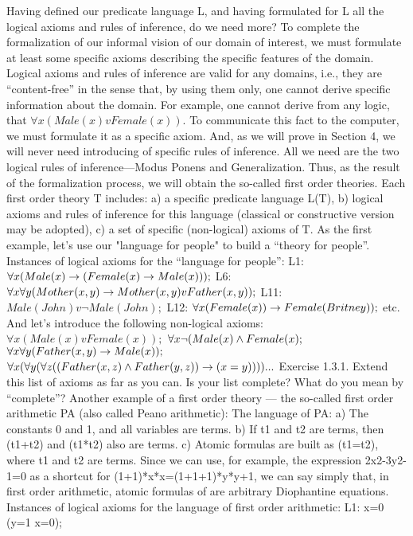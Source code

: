 Having defined our predicate language L, and having formulated for L all the logical axioms and rules of
inference, do we need more?
To complete the formalization of our informal vision of our domain of interest, we must formulate at least
some specific axioms describing the specific features of the domain. Logical axioms and rules of
inference are valid for any domains, i.e., they are ``content-free'' in the sense that, by using them only, one
cannot derive specific information about the domain.
For example, one cannot derive from any logic, that \(\forall x (Male(x) v Female(x))\). To communicate this fact
to the computer, we must formulate it as a specific axiom.
And, as we will prove in Section 4, we will never need introducing of specific rules of inference. All we
need are the two logical rules of inference---Modus Ponens and Generalization.
Thus, as the result of the formalization process, we will obtain the so-called first order theories.
Each first order theory T includes:
a) a specific predicate language L(T),
b) logical axioms and rules of inference for this language (classical or constructive version may be
adopted),
c) a set of specific (non-logical) axioms of T.
As the first example, let's use our "language for people" to build a ``theory for people''.
Instances of logical axioms for the ``language for people'':
L1: \(\forall x(Male(x)\rightarrow (Female(x)\rightarrow Male(x)));\)
L6: \(\forall x\forall y(Mother(x, y)\rightarrow Mother(x, y) v Father(x, y));\)
L11: \(Male(John) v \neg Male(John);\)
L12: \(\forall x(Female(x))\rightarrow Female(Britney));\)
etc.
And let's introduce the following non-logical axioms:
\(\forall x (Male(x) v Female(x));\)
\(\forall x \neg (Male(x) \wedge  Female(x);\)
\(\forall x\forall y (Father (x, y)\rightarrow Male(x));\)
\(\forall x(\forall y(\forall z((Father(x, z)\wedge Father(y,z))\rightarrow (x=y)))) ...\)
Exercise 1.3.1. Extend this list of axioms as far as you can. Is your list complete? What do you mean by ``complete''?
Another example of a first order theory --- the so-called first order arithmetic PA (also called Peano arithmetic):
The language of PA:
a) The constants 0 and 1, and all variables are terms.
b) If t1 and t2 are terms, then (t1+t2) and (t1*t2) also are terms.
c) Atomic formulas are built as (t1=t2), where t1 and t2 are terms.
Since we can use, for example, the expression 2x2-3y2-1=0 as a shortcut for (1+1)*x*x=(1+1+1)*y*y+1, we can say simply
that, in first order arithmetic, atomic formulas of are arbitrary Diophantine equations.
Instances of logical axioms for the language of first order arithmetic:
L1: x=0 \IMPLIES  (y=1 \IMPLIES  x=0);
